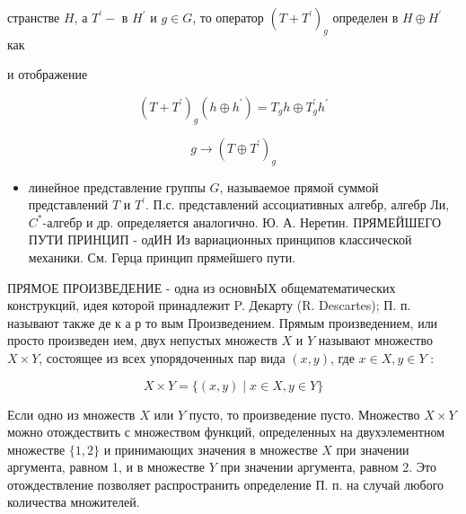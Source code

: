 \documentclass[10pt]{article}
\begin{document}
странстве $H$, а $T^{\prime}-$ в $H^{\prime}$ и $g \in G$, то оператор $\left(T+T^{\prime}\right)_{g}$ определен в $H \oplus H^{\prime}$ как



и отображение



\[

\left(T+T^{\prime}\right)_{g}\left(h \oplus h^{\prime}\right)=T_{g} h \oplus T_{g}^{\prime} h^{\prime}

\]



\[

g \rightarrow\left(T \oplus T^{\prime}\right)_{g}

\]



\begin{itemize}

  \item линейное представление группы $G$, называемое прямой суммой представлений $T$ и $T^{\prime}$. П.с. представлений ассоциативных алгебр, алгебр Ли, $C^{*}$-алгебр и др. определяется аналогично. Ю. А. Неретин. ПРЯМЕЙШЕГО ПУТИ ПРИНЦИП - одИН Из вариационных принципов классической механики. См. Герца принцип прямейшего пути.

\end{itemize}



ПРЯМОЕ ПРОИЗВЕДЕНИЕ - одна из основнЫХ общематематических конструкций, идея которой принадлежит P. Декарту (R. Descartes); П. п. называют также де к а р то вым Произведением. Прямым произведением, или просто произведен ием, двух непустых множеств $X$ и $Y$ называют множество $X \times Y$, состоящее из всех упорядоченных пар вида $(x, y)$, где $x \in X, y \in Y$ :



\[

X \times Y=\{(x, y) \mid x \in X, y \in Y\}

\]



Если одно из множеств $X$ или $Y$ пусто, то произведение пусто. Множество $X \times Y$ можно отождествить с множеством функций, определенных на двухэлементном множестве $\{1,2\}$ и принимающих значения в множестве $X$ при значении аргумента, равном 1, и в множестве $Y$ при значении аргумента, равном 2. Это отождествление позволяет распространить определение П. п. на случай любого количества множителей.
\end{document}
